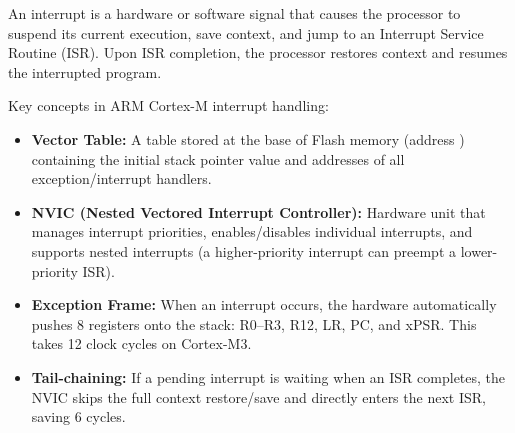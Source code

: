 \begin{definition}[Interrupt]
An interrupt is a hardware or software signal that causes the processor to suspend its current execution, save context, and jump to an Interrupt Service Routine (ISR). Upon ISR completion, the processor restores context and resumes the interrupted program.
\end{definition}

Key concepts in ARM Cortex-M interrupt handling:

\begin{itemize}
  \item \textbf{Vector Table:} A table stored at the base of Flash memory (address ) containing the initial stack pointer value and addresses of all exception/interrupt handlers.
  \item \textbf{NVIC (Nested Vectored Interrupt Controller):} Hardware unit that manages interrupt priorities, enables/disables individual interrupts, and supports nested interrupts (a higher-priority interrupt can preempt a lower-priority ISR).
  \item \textbf{Exception Frame:} When an interrupt occurs, the hardware automatically pushes 8 registers onto the stack: R0--R3, R12, LR, PC, and xPSR. This takes 12 clock cycles on Cortex-M3.
  \item \textbf{Tail-chaining:} If a pending interrupt is waiting when an ISR completes, the NVIC skips the full context restore/save and directly enters the next ISR, saving 6 cycles.
\end{itemize}

